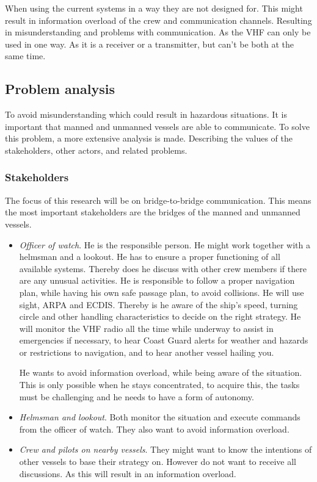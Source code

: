 When using the current systems in a way they are not designed for. This might result in information overload of the crew and communication channels. Resulting in misunderstanding and problems with communication. As the \ac{VHF} can only be used in one way. As it is a receiver or a transmitter, but can't be both at the same time. 

\subsection{Problem analysis}
To avoid misunderstanding which could result in hazardous situations. It is important that manned and unmanned vessels are able to communicate. To solve this problem, a more extensive analysis is made. 
Describing the values of the stakeholders, other actors, and related problems.

\subsubsection{Stakeholders}
The focus of this research will be on bridge-to-bridge communication. This means the most important stakeholders are the bridges of the manned and unmanned vessels.
\begin{itemize}
	\item \emph{Officer of watch}. He is the responsible person. He might work together with a helmsman and a lookout. He has to ensure a proper functioning of all available systems. Thereby does he discuss with other crew members if there are any unusual activities. He is responsible to follow a proper navigation plan, while having his own safe passage plan, to avoid collisions. He will use sight, \ac{ARPA} and \ac{ECDIS}. Thereby is he aware of the ship's speed, turning circle and other handling characteristics to decide on the right strategy. He will monitor the \ac{VHF} radio all the time while underway to assist in emergencies if necessary, to hear Coast Guard alerts for weather and hazards or restrictions to navigation, and to hear another vessel hailing you.
	
	He wants to avoid information overload, while being aware of the situation. This is only possible when he stays concentrated, to acquire this, the tasks must be challenging and he needs to have a form of autonomy.

	\item \emph{Helmsman and lookout}. Both monitor the situation and execute commands from the officer of watch. They also want to avoid information overload.
	
	\item \emph{Crew and pilots on nearby vessels}. They might want to know the intentions of other vessels to base their strategy on. However do not want to receive all discussions. As this will result in an information overload.
\end{itemize}

